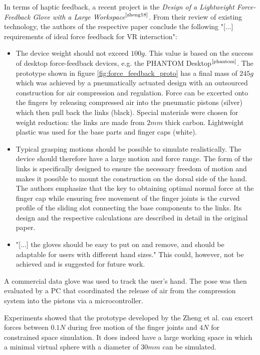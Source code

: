 \documentclass[hyperref, bachelorofscience]{cgvpub}
\newcommand{\newcite}[1]{$ ^{\text{\cite{#1}}} $}
\begin{document}
In terms of haptic feedback, a recent project is the \emph{Design of a Lightweight Force-Feedback Glove with a Large Workspace}\newcite{zheng18}. From their review of existing technology, the authors of the respective paper conclude the following "[$\dots$] requirements of ideal force feedback for VR interaction":
\vspace{.3cm}
\begin{itemize}
	\item The device weight should not exceed $ 100g $. This value is based on the success of desktop force-feedback devices, e.g. the PHANTOM Desktop\newcite{phantom}. The prototype shown in figure \ref{fig:force_feedback_proto} has a final mass of $ 245g $ which was achieved by a pneumatically actuated design with an outsourced construction for air compression and regulation. Force can be excerted onto the fingers by releasing compressed air into the pneumatic pistons (silver) which then pull back the links (black). Special materials were chosen for weight reduction: the links are made from $ 2mm $ thick carbon. Lightweight plastic was used for the base parts and finger caps (white).
	\item Typical grasping motions should be possible to simulate realistically. The device should therefore have a large motion and force range. The form of the links is specifically designed to ensure the necessary freedom of motion and makes it possible to mount the construction on the dorsal side of the hand. The authors emphasize that the key to obtaining optimal normal force at the finger cap while ensuring free movement of the finger joints is the curved profile of the sliding slot connecting the base components to the links. Its design and the respective calculations are described in detail in the original paper.
	\item "[$\dots$] the gloves should be easy to put on and remove, and should be adaptable for users with different hand sizes." This could, however, not be achieved and is suggested for future work.
\end{itemize}

A commercial data glove was used to track the user's hand. The pose was then evaluated by a PC that coordinated the release of air from the compression system into the pistons via a microcontroller. 

Experiments showed that the prototype developed by the Zheng et al. can excert forces between $ 0.1N $ during free motion of the finger joints and $ 4N $ for constrained space simulation. It does indeed have a large working space in which a minimal virtual sphere with a diameter of $ 30mm $ can be simulated.
\end{document}
